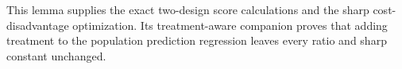 This lemma supplies the exact two-design score calculations and the sharp cost-disadvantage optimization. Its treatment-aware companion proves that adding treatment to the population prediction regression leaves every ratio and sharp constant unchanged.